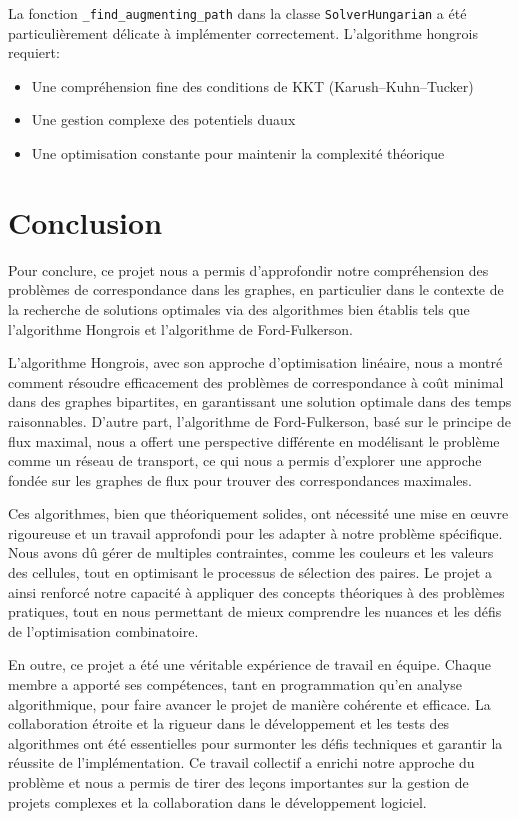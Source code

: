 \documentclass[11pt, a4paper]{article}
\begin{document}
La fonction \texttt{\_find\_augmenting\_path} dans la classe \texttt{SolverHungarian} a été particulièrement délicate à implémenter correctement. L'algorithme hongrois requiert:
\begin{itemize}
    \item Une compréhension fine des conditions de KKT (Karush–Kuhn–Tucker)
    \item Une gestion complexe des potentiels duaux
    \item Une optimisation constante pour maintenir la complexité théorique
\end{itemize}

\section{Conclusion}
\label{sec:conclusion}

Pour conclure, ce projet nous a permis d'approfondir notre compréhension des problèmes de correspondance dans les graphes, en particulier dans le contexte de la recherche de solutions optimales via des algorithmes bien établis tels que l'algorithme Hongrois et l'algorithme de Ford-Fulkerson.

L'algorithme Hongrois, avec son approche d'optimisation linéaire, nous a montré comment résoudre efficacement des problèmes de correspondance à coût minimal dans des graphes bipartites, en garantissant une solution optimale dans des temps raisonnables. D'autre part, l'algorithme de Ford-Fulkerson, basé sur le principe de flux maximal, nous a offert une perspective différente en modélisant le problème comme un réseau de transport, ce qui nous a permis d'explorer une approche fondée sur les graphes de flux pour trouver des correspondances maximales.

Ces algorithmes, bien que théoriquement solides, ont nécessité une mise en œuvre rigoureuse et un travail approfondi pour les adapter à notre problème spécifique. Nous avons dû gérer de multiples contraintes, comme les couleurs et les valeurs des cellules, tout en optimisant le processus de sélection des paires. Le projet a ainsi renforcé notre capacité à appliquer des concepts théoriques à des problèmes pratiques, tout en nous permettant de mieux comprendre les nuances et les défis de l'optimisation combinatoire.

En outre, ce projet a été une véritable expérience de travail en équipe. Chaque membre a apporté ses compétences, tant en programmation qu'en analyse algorithmique, pour faire avancer le projet de manière cohérente et efficace. La collaboration étroite et la rigueur dans le développement et les tests des algorithmes ont été essentielles pour surmonter les défis techniques et garantir la réussite de l'implémentation. Ce travail collectif a enrichi notre approche du problème et nous a permis de tirer des leçons importantes sur la gestion de projets complexes et la collaboration dans le développement logiciel.
\end{document}
